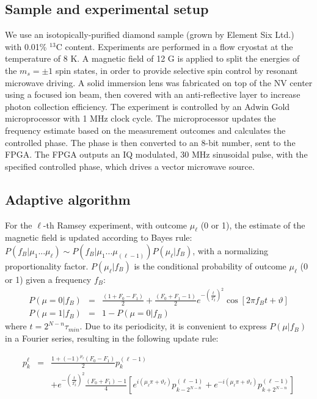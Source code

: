 \subsection{Sample and experimental setup}
We use an isotopically-purified diamond sample (grown by Element Six Ltd.) with 0.01\% $^{13}$C content. Experiments are performed in a flow cryostat at the temperature of 8 K. A magnetic field of 12 G is applied to split the energies of the $m_s = \pm 1$ spin states, in order to provide selective spin control by resonant microwave driving. A solid immersion lens was fabricated on top of the NV center using a focused ion beam, then covered with an anti-reflective layer to increase photon collection efficiency.  
The experiment is controlled by an Adwin Gold microprocessor with 1 MHz clock cycle. The microprocessor updates the frequency estimate based on the measurement outcomes and calculates the controlled phase. The phase is then converted to an 8-bit number, sent to the FPGA. The FPGA outputs an IQ modulated, 30 MHz sinusoidal pulse, with the specified controlled phase, which drives a vector microwave source.

\subsection{Adaptive algorithm}
For the $\ell$-th Ramsey experiment, with outcome $\mu_{\ell}$ (0 or 1), the estimate of the magnetic field is updated according to Bayes rule: $P(f_B | \mu_{1}...\mu_{\ell})\sim P(f_B | \mu_{1} ... \mu_{(\ell-1)}) P(\mu_{\ell} | f_B )$, with a normalizing proportionality factor. $P(\mu_\ell |f_B)$ is the conditional probability of outcome $\mu_\ell$ (0 or 1) given a frequency $f_B$:
\begin{eqnarray*}
P(\mu = 0 | f_B ) &=& \frac{(1+F_0-F_1)}{2} + \frac{(F_0+F_1-1)}{2}  e^{-(\frac{t}{T_{2}^{*}})^{2}} \cos [ 2\pi f_B t + \vartheta ] \\
P(\mu = 1 | f_B) &=& 1 - P(\mu = 0 | f_B)
\end{eqnarray*}
where $t = 2^{N-n} \tau_{min}$. Due to its periodicity, it is convenient to express $P(\mu | f_B)$ in a Fourier series, resulting in the following update rule:

\begin{eqnarray*}
p_k^{\ell} &=& \frac{1 + (-1)^{\mu_{\ell}} (F_{0}-F_{1})} {2} p_{k}^{(\ell - 1)} \\
& & + e^{-(\frac{t}{T_{2}^{*}})^{2}} \frac{(F_{0} + F_{1}) - 1}{4} \left[ e^{i(\mu_{\ell}\pi + \vartheta_{\ell})} p_{k-2^{N-n}}^{(\ell - 1)} + e^{-i(\mu_{\ell}\pi + \vartheta_{\ell})} p_{k + 2^{N-n}}^{(\ell - 1)} \right] \nonumber
\end{eqnarray*}

